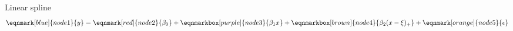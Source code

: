 \documentclass[english]{beamer}
\newcommand{\alertblue}[1]{{\color{blue}#1}}
\begin{document}
\begin{frame}{Linear spline}%
        \begin{equation*}
            \eqnmark[blue]{node1}{y} =
            \eqnmark[red]{node2}{\beta_0} +
            \eqnmarkbox[purple]{node3}{\beta_1 x} +
            \eqnmarkbox[brown]{node4}{\beta_2 (x - \xi)_+} +
            \eqnmark[orange]{node5}{\epsilon}
        \end{equation*}


\end{frame}
\end{document}
